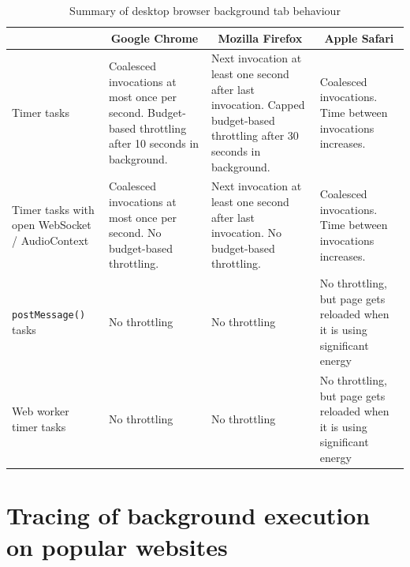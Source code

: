 \documentclass[
	ngerman,
	ruledheaders=section,%
	class=report,%
	thesis={type=bachelor},%
	accentcolor=9c,%
	custommargins=true,%
	marginpar=false,%
	parskip=half-,%
	fontsize=11pt,%
]{tudapub}
\begin{document}
  \begin{table}
    \begin{adjustbox}{center}

    \begin{tabular}{ p{3cm} | p{} | p{} | p{} }
                              & \multicolumn{1}{c|}{Google Chrome} & \multicolumn{1}{c|}{Mozilla Firefox} & \multicolumn{1}{c}{Apple Safari} \\
      \hline
      Timer tasks & Coalesced invocations at most once per second.
               Budget-based throttling after 10 seconds in background.
                              & Next invocation at least one second after last invocation.
                                Capped budget-based throttling after 30 seconds in background.
                              & Coalesced invocations. Time between invocations increases. \\
      \hline
      Timer tasks with open WebSocket / AudioContext
                              & Coalesced invocations at most once per second. No budget-based throttling.
                              & Next invocation at least one second after last invocation. No budget-based throttling.
                              & Coalesced invocations. Time between invocations increases. \\
      \hline
      \texttt{postMessage()} tasks    & No throttling
                              & No throttling
                              & No throttling, but page gets reloaded when it is using significant energy \\
      \hline
      Web worker timer tasks  & No throttling
                              & No throttling
                              & No throttling, but page gets reloaded when it is using significant energy
    \end{tabular}
    \end{adjustbox}
    \caption{Summary of desktop browser background tab behaviour}
    \label{tab:desktop-browser-background}
  \end{table}

 

  \newpage
  \chapter{Tracing of background execution on popular websites}
\end{document}
